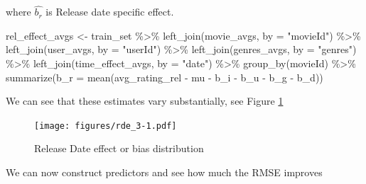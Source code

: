 \documentclass[
]{article}
\newenvironment{Shaded}{}{}
\newcommand{\AttributeTok}[1]{\textcolor[rgb]{0.49,0.56,0.16}{#1}}
\newcommand{\FunctionTok}[1]{\textcolor[rgb]{0.02,0.16,0.49}{#1}}
\newcommand{\NormalTok}[1]{#1}
\newcommand{\OtherTok}[1]{\textcolor[rgb]{0.00,0.44,0.13}{#1}}
\newcommand{\SpecialCharTok}[1]{\textcolor[rgb]{0.25,0.44,0.63}{#1}}
\newcommand{\StringTok}[1]{\textcolor[rgb]{0.25,0.44,0.63}{#1}}
\begin{document}
where \(\hat{b_{r}}\) is Release date specific effect.

\begin{Shaded}
\begin{Highlighting}[]
\NormalTok{rel\_effect\_avgs }\OtherTok{\textless{}{-}}\NormalTok{ train\_set }\SpecialCharTok{\%\textgreater{}\%} \FunctionTok{left\_join}\NormalTok{(movie\_avgs, }\AttributeTok{by =} \StringTok{"movieId"}\NormalTok{) }\SpecialCharTok{\%\textgreater{}\%} 
    \FunctionTok{left\_join}\NormalTok{(user\_avgs, }\AttributeTok{by =} \StringTok{"userId"}\NormalTok{) }\SpecialCharTok{\%\textgreater{}\%} \FunctionTok{left\_join}\NormalTok{(genres\_avgs, }
    \AttributeTok{by =} \StringTok{"genres"}\NormalTok{) }\SpecialCharTok{\%\textgreater{}\%} \FunctionTok{left\_join}\NormalTok{(time\_effect\_avgs, }\AttributeTok{by =} \StringTok{"date"}\NormalTok{) }\SpecialCharTok{\%\textgreater{}\%} 
    \FunctionTok{group\_by}\NormalTok{(movieId) }\SpecialCharTok{\%\textgreater{}\%} \FunctionTok{summarize}\NormalTok{(}\AttributeTok{b\_r =} \FunctionTok{mean}\NormalTok{(avg\_rating\_rel }\SpecialCharTok{{-}} 
\NormalTok{    mu }\SpecialCharTok{{-}}\NormalTok{ b\_i }\SpecialCharTok{{-}}\NormalTok{ b\_u }\SpecialCharTok{{-}}\NormalTok{ b\_g }\SpecialCharTok{{-}}\NormalTok{ b\_d))}
\end{Highlighting}
\end{Shaded}

\newpage

We can see that these estimates vary substantially, see Figure
\ref{fig:model_6}

\begin{figure}
\centering
\texttt{[image: figures/rde\_3-1.pdf]}
\caption{Release Date effect or bias distribution\label{fig:model_6}}
\end{figure}

We can now construct predictors and see how much the RMSE improves
\end{document}
